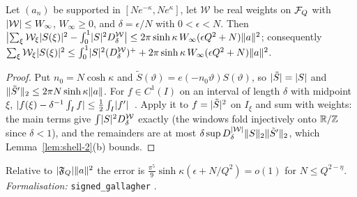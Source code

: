 \begin{lemma}\label{lem:shell-3}
Let $(a_n)$ be supported in $[Ne^{-\kappa},Ne^{\kappa}]$, let $\mathcal W$ be real weights on $\mathcal F_Q$ with $\lvert \mathcal W\rvert\le W_\infty$, $W_\infty\ge0$, and
$\delta=\epsilon/N$ with $0<\epsilon<N$. Then
$\bigl|\sum_\xi\mathcal W_\xi\lvert S(\xi)\rvert^2-\int_0^1\lvert S\rvert^2D^{\mathcal W}_\delta\bigr|\le2\pi\sinh\kappa\,W_\infty(\epsilon Q^2+N)\lVert a\rVert^2$; consequently
$\sum_\xi\mathcal W_\xi\lvert S(\xi)\rvert^2\le\int_0^1\lvert S\rvert^2(D^{\mathcal W}_\delta)^++2\pi\sinh\kappa\,W_\infty(\epsilon Q^2+N)\lVert a\rVert^2$.
\end{lemma}
\begin{proof}
Put $n_0=N\cosh\kappa$ and $\tilde S(\vartheta)=e(-n_0\vartheta)S(\vartheta)$, so $\lvert \tilde S\rvert=\lvert S\rvert$ and $\lVert \tilde S'\rVert_2\le2\pi N\sinh\kappa\lVert a\rVert$. For
$f\in C^1(I)$ on an interval of length $\delta$ with midpoint $\xi$, $\lvert f(\xi)-\delta^{-1}\int_If\rvert\le\frac12\int_I\lvert f'\rvert$~\cite[proof of Lemma~1]{Mont78}. Apply
it to $f=\lvert \tilde S\rvert^2$ on $I_\xi$ and sum with weights: the main terms give $\int\lvert S\rvert^2D^{\mathcal W}_\delta$ exactly (the windows fold injectively onto
$\mathbb R/\mathbb Z$ since $\delta<1$), and the remainders are at most $\delta\sup D^{\lvert \mathcal W\rvert}_\delta\lVert S\rVert_2\lVert \tilde S'\rVert_2$, which Lemma~\ref{lem:shell-2}(b) bounds.
\end{proof}
Relative to $\lvert \mathfrak F_Q\rvert\lVert a\rVert^2$ the error is $\frac{\pi^5}9\sinh\kappa(\epsilon+N/Q^2)=o(1)$ for $N\le Q^{2-\eta}$. \emph{Formalisation:}
\texttt{signed\_gallagher} \tagL.

